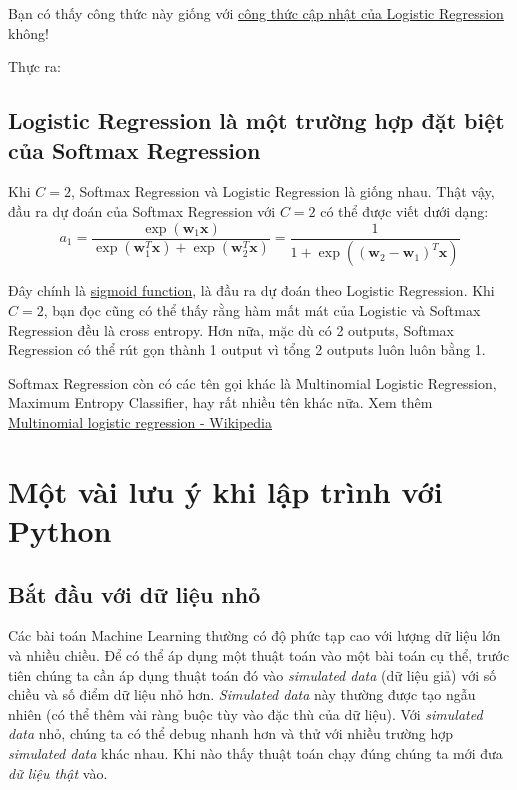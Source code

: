 Bạn có thấy công thức này giống với \href{http://127.0.0.1:4000/2017/01/27/logisticregression/#cong-thuc-cap-nhat-cho-logistic-sigmoid-regression}{công thức cập nhật của Logistic Regression} không! 
 
Thực ra: 
 
 
\subsection{Logistic Regression là một trường hợp đặt biệt của Softmax Regression }
 
Khi $C = 2$, Softmax Regression và Logistic Regression là giống nhau. Thật vậy, đầu ra dự đoán của Softmax Regression với $C= 2$ có thể được viết dưới dạng:  
\begin{equation}
a_1 = \frac{\exp(\mathbf{w}_1\mathbf{x})} {\exp(\mathbf{w}_1^T\mathbf{x}) + \exp(\mathbf{w}_2^T\mathbf{x})}= \frac{1}{1 + \exp((\mathbf{w}_2 - \mathbf{w}_1)^T\mathbf{x})} 
\end{equation}
 
Đây chính là \href{http://machinelearningcoban.com/2017/01/27/logisticregression/#sigmoid-function}{sigmoid function}, là đầu ra dự đoán theo Logistic Regression. Khi $C = 2$, bạn đọc cũng có thể thấy rằng hàm mất mát của Logistic và Softmax Regression đều là cross entropy. Hơn nữa, mặc dù có 2 outputs, Softmax Regression có thể rút gọn thành 1 output vì tổng 2 outputs luôn luôn bằng 1. 
 
Softmax Regression còn có các tên gọi khác là Multinomial Logistic Regression, Maximum Entropy Classifier, hay rất nhiều tên khác nữa. Xem thêm \href{https://en.wikipedia.org/wiki/Multinomial_logistic_regression}{Multinomial logistic regression - Wikipedia} 
 
\section{Một vài lưu ý khi lập trình với Python }
 
 
\subsection{Bắt đầu với dữ liệu nhỏ}
Các bài toán Machine Learning thường có độ phức tạp cao với lượng dữ liệu lớn và nhiều chiều. Để có thể áp dụng một thuật toán vào một bài toán cụ thể, trước tiên chúng ta cần áp dụng thuật toán đó vào \textit{simulated data} (dữ liệu giả) với số chiều và số điểm dữ liệu nhỏ hơn. \textit{Simulated data} này thường được tạo ngẫu nhiên (có thể thêm vài ràng buộc tùy vào đặc thù của dữ liệu). Với \textit{simulated data} nhỏ, chúng ta có thể debug nhanh hơn và thử với nhiều trường hợp \textit{simulated data} khác nhau. Khi nào thấy thuật toán chạy đúng chúng ta mới đưa \textit{dữ liệu thật} vào.  
 
